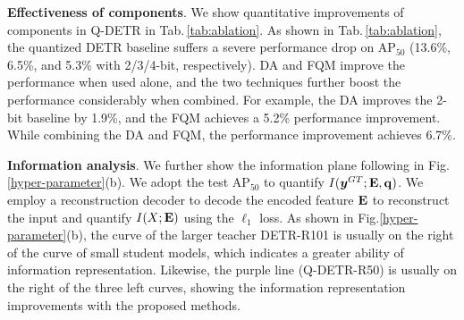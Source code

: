\documentclass[10pt,twocolumn,letterpaper]{article}
\begin{document}
\textbf{Effectiveness of components}. We show quantitative improvements of components in Q-DETR in Tab.\,\ref{tab:ablation}.
As shown in Tab.\,\ref{tab:ablation}, the quantized DETR baseline suffers a severe performance drop on AP$_{50}$ (13.6\%, 6.5\%, and 5.3\% with 2/3/4-bit, respectively). DA and FQM improve the performance when used alone, and the two techniques further boost the performance considerably when combined. For example, the DA improves the 2-bit baseline by 1.9\%, and the FQM achieves a 5.2\% performance improvement. While combining the DA and FQM, the performance improvement achieves 6.7\%. 

\textbf{Information analysis}. We further show the information plane following \cite{wang2021revisiting} in Fig.\;\ref{hyper-parameter}(b). We adopt the test AP$_{50}$ to quantify $I(\bm{y}^{GT}; {\bf E}, {\bf q})$. We employ a reconstruction decoder to decode the encoded feature ${\bf E}$ to reconstruct the input and quantify $I(X;{\bf E})$ using the $\ell_1$ loss. As shown in  Fig.\;\ref{hyper-parameter}(b), the curve of the larger teacher DETR-R101 is usually on the right of the curve of small student models, which indicates a greater ability of information representation. Likewise, the purple line (Q-DETR-R50) is usually on the right of the three left curves, showing the information representation improvements with the proposed methods. 


\end{document}
